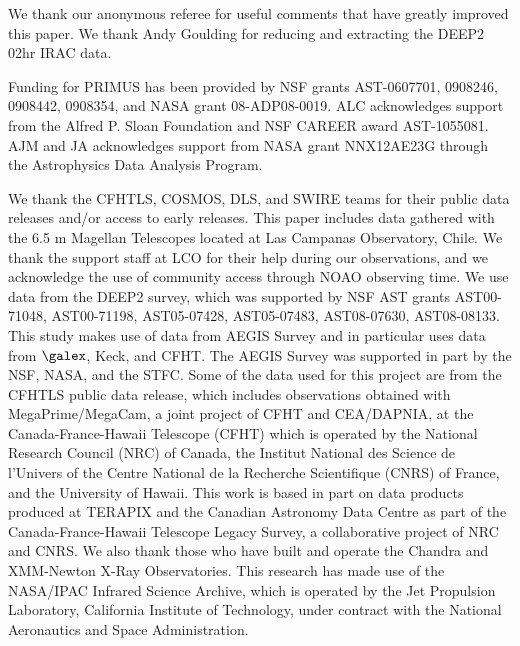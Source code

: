 \vspace{4em}
We thank our anonymous referee for useful comments that have greatly improved
this paper. We thank Andy Goulding for reducing and extracting the DEEP2 02hr
IRAC data.

Funding for PRIMUS has been provided by NSF grants AST-0607701, 0908246,
0908442, 0908354, and NASA grant 08-ADP08-0019. ALC acknowledges support from
the Alfred P. Sloan Foundation and NSF CAREER award AST-1055081. AJM and JA
acknowledges support from NASA grant NNX12AE23G through the Astrophysics Data
Analysis Program.

We thank the CFHTLS, COSMOS, DLS, and SWIRE teams for their public data
releases and/or access to early releases. This paper includes data gathered
with the 6.5 m Magellan Telescopes located at Las Campanas Observatory, Chile.
We thank the support staff at LCO for their help during our observations, and
we acknowledge the use of community access through NOAO observing time. We use
data from the DEEP2 survey, which was supported by NSF AST grants AST00-71048,
AST00-71198, AST05-07428, AST05-07483, AST08-07630, AST08-08133. This study
makes use of data from AEGIS Survey and in particular uses data from $\galex$,
Keck, and CFHT. The AEGIS Survey was supported in part by the NSF, NASA, and
the STFC. Some of the data used for this project are from the CFHTLS public
data release, which includes observations obtained with MegaPrime/MegaCam, a
joint project of CFHT and CEA/DAPNIA, at the Canada-France-Hawaii Telescope
(CFHT) which is operated by the National Research Council (NRC) of Canada, the
Institut National des Science de l'Univers of the Centre National de la
Recherche Scientifique (CNRS) of France, and the University of Hawaii. This
work is based in part on data products produced at TERAPIX and the Canadian
Astronomy Data Centre as part of the Canada-France-Hawaii Telescope Legacy
Survey, a collaborative project of NRC and CNRS. We also thank those who have
built and operate the Chandra and XMM-Newton X-Ray Observatories. This research
has made use of the NASA/IPAC Infrared Science Archive, which is operated by
the Jet Propulsion Laboratory, California Institute of Technology, under
contract with the National Aeronautics and Space Administration.

